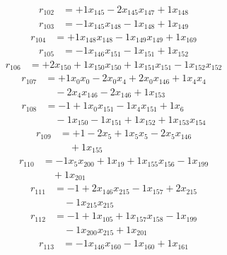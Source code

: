 \[\begin{aligned}
r_{102} &= + 1 x_{145} - 2 x_{145} x_{147} + 1 x_{148}
\end{aligned}\]
\[\begin{aligned}
r_{103} &= - 1 x_{145} x_{148} - 1 x_{148} + 1 x_{149}
\end{aligned}\]
\[\begin{aligned}
r_{104} &= + 1 x_{148} x_{148} - 1 x_{149} x_{149} + 1 x_{169}
\end{aligned}\]
\[\begin{aligned}
r_{105} &= - 1 x_{146} x_{151} - 1 x_{151} + 1 x_{152}
\end{aligned}\]
\[\begin{aligned}
r_{106} &= + 2 x_{150} + 1 x_{150} x_{150} + 1 x_{151} x_{151} - 1 x_{152} x_{152}
\end{aligned}\]
\[\begin{aligned}
r_{107} &= + 1 x_{0} x_{0} - 2 x_{0} x_{4} + 2 x_{0} x_{146} + 1 x_{4} x_{4} \\
 &\quad - 2 x_{4} x_{146} - 2 x_{146} + 1 x_{153}
\end{aligned}\]
\[\begin{aligned}
r_{108} &= - 1 + 1 x_{0} x_{151} - 1 x_{4} x_{151} + 1 x_{6} \\
 &\quad - 1 x_{150} - 1 x_{151} + 1 x_{152} + 1 x_{153} x_{154}
\end{aligned}\]
\[\begin{aligned}
r_{109} &= + 1 - 2 x_{5} + 1 x_{5} x_{5} - 2 x_{5} x_{146} \\
 &\quad + 1 x_{155}
\end{aligned}\]
\[\begin{aligned}
r_{110} &= - 1 x_{5} x_{200} + 1 x_{19} + 1 x_{155} x_{156} - 1 x_{199} \\
 &\quad + 1 x_{201}
\end{aligned}\]
\[\begin{aligned}
r_{111} &= - 1 + 2 x_{146} x_{215} - 1 x_{157} + 2 x_{215} \\
 &\quad - 1 x_{215} x_{215}
\end{aligned}\]
\[\begin{aligned}
r_{112} &= - 1 + 1 x_{105} + 1 x_{157} x_{158} - 1 x_{199} \\
 &\quad - 1 x_{200} x_{215} + 1 x_{201}
\end{aligned}\]
\[\begin{aligned}
r_{113} &= - 1 x_{146} x_{160} - 1 x_{160} + 1 x_{161}
\end{aligned}\]
